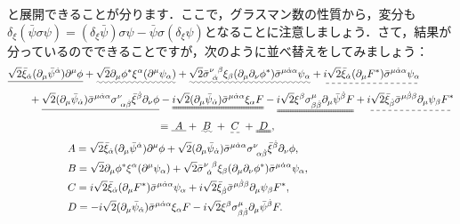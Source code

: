 \documentclass[a4paper,uplatex,dvipdfmx]{jsarticle}
\theoremstyle{definition}
\begin{document}
と展開できることが分ります．ここで，グラスマン数の性質から，変分も$\delta_{\xi}(\bar{\psi}\sigma\psi)=(\delta_{\xi}\bar{\psi})\sigma\psi-\bar{\psi}\sigma(\delta_{\xi}\psi)$となることに注意しましょう．さて，結果が分っているのでできることですが，次のように並べ替えをしてみましょう：
\begin{align}
  &
  \uline{
    \sqrt{2}\bar{\xi}_{\dot{\alpha}}(\partial_{\mu}\bar{\psi}^{\dot{\alpha}})\partial^{\mu}\phi
  }
  +
  \uwave{
    \sqrt{2}\partial_{\mu}\phi^{*}\xi^{\alpha}(\partial^{\mu}\psi_{\alpha})
  }
  +
  \uwave{
    \sqrt{2}\bar{\sigma}^{\nu\ \beta}_{\ \dot{\alpha}}\xi_{\beta}(\partial_{\mu}\partial_{\nu}\phi^{*})\bar{\sigma}^{\mu\dot{\alpha}\alpha}\psi_{\alpha}
  }
  +
  \dashuline{
    i\sqrt{2}\bar{\xi}_{\dot{\alpha}}(\partial_{\mu}F^{*})\bar{\sigma}^{\mu\dot{\alpha}\alpha}\psi_{\alpha}
  }
  \nonumber
  \\
  &\qquad
  +
  \uline{
    \sqrt{2}(\partial_{\mu}\bar{\psi}_{\dot{\alpha}})\bar{\sigma}^{\mu\dot{\alpha}\alpha}\sigma^{\nu}_{\ \alpha\dot{\beta}}\bar{\xi}^{\dot{\beta}}\partial_{\nu}\phi
  }
  -
  \uuline{
    i\sqrt{2}(\partial_{\mu}\bar{\psi}_{\dot{\alpha}})\bar{\sigma}^{\mu\dot{\alpha}\alpha}\xi_{\alpha}F
  }
  -
  \uuline{
    i\sqrt{2}\xi^{\beta}\sigma^{\mu}_{\beta\dot{\beta}}\partial_{\mu}\bar{\psi}^{\dot{\beta}}F
  }
  +
  \dashuline{
    i\sqrt{2}\bar{\xi}_{\dot{\beta}}\bar{\sigma}^{\mu\dot{\beta}\beta}\partial_{\mu}\psi_{\beta}F^{*}
  }
  \nonumber
  \\
  &\hspace{5cm}
  \equiv
  \uline{\ A\ }
  +
  \uwave{\ B\ }
  +
  \dashuline{\ C\ }
  +
  \uuline{\ D\ }
  ,
  \\
  &\hspace{2cm}
  A
  =
  \sqrt{2}\bar{\xi}_{\dot{\alpha}}(\partial_{\mu}\bar{\psi}^{\dot{\alpha}})\partial^{\mu}\phi  
  +
  \sqrt{2}(\partial_{\mu}\bar{\psi}_{\dot{\alpha}})\bar{\sigma}^{\mu\dot{\alpha}\alpha}\sigma^{\nu}_{\ \alpha\dot{\beta}}\bar{\xi}^{\dot{\beta}}\partial_{\nu}\phi
  ,
  \\
  &\hspace{2cm}
  B
  =
  \sqrt{2}\partial_{\mu}\phi^{*}\xi^{\alpha}(\partial^{\mu}\psi_{\alpha})
  +
  \sqrt{2}\bar{\sigma}^{\nu\ \beta}_{\ \dot{\alpha}}\xi_{\beta}(\partial_{\mu}\partial_{\nu}\phi^{*})\bar{\sigma}^{\mu\dot{\alpha}\alpha}\psi_{\alpha}
  ,
  \\
  &\hspace{2cm}
  C
  =
  i\sqrt{2}\bar{\xi}_{\dot{\alpha}}(\partial_{\mu}F^{*})\bar{\sigma}^{\mu\dot{\alpha}\alpha}\psi_{\alpha}
  +
  i\sqrt{2}\bar{\xi}_{\dot{\beta}}\bar{\sigma}^{\mu\dot{\beta}\beta}\partial_{\mu}\psi_{\beta}F^{*}
  ,
  \\
  &\hspace{2cm}
  D
  =
  -
  i\sqrt{2}(\partial_{\mu}\bar{\psi}_{\dot{\alpha}})\bar{\sigma}^{\mu\dot{\alpha}\alpha}\xi_{\alpha}F
  -
  i\sqrt{2}\xi^{\beta}\sigma^{\mu}_{\beta\dot{\beta}}\partial_{\mu}\bar{\psi}^{\dot{\beta}}F
  .
\end{align}
\end{document}
